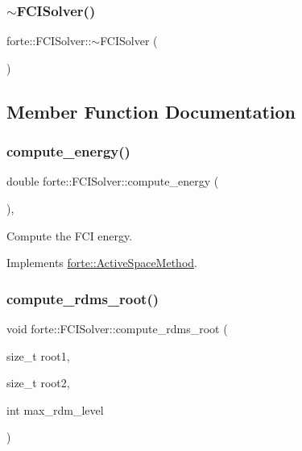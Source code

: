 \subsubsection{\texorpdfstring{$\sim$\+F\+C\+I\+Solver()}{~FCISolver()}}
{\footnotesize\ttfamily forte\+::\+F\+C\+I\+Solver\+::$\sim$\+F\+C\+I\+Solver (\begin{DoxyParamCaption}{ }\end{DoxyParamCaption})\hspace{0.3cm}{\ttfamily [default]}}



\subsection{Member Function Documentation}
\mbox{\label{classforte_1_1_f_c_i_solver_a5ea02e6826ffd8eb01fd25c229517159}} 
\subsubsection{\texorpdfstring{compute\+\_\+energy()}{compute\_energy()}}
{\footnotesize\ttfamily double forte\+::\+F\+C\+I\+Solver\+::compute\+\_\+energy (\begin{DoxyParamCaption}{ }\end{DoxyParamCaption})\hspace{0.3cm}{\ttfamily [override]}, {\ttfamily [virtual]}}



Compute the F\+CI energy. 



Implements \mbox{\hyperlink{classforte_1_1_active_space_method_a99736e2b94405371b224b0750569b077}{forte\+::\+Active\+Space\+Method}}.

\mbox{\label{classforte_1_1_f_c_i_solver_a36c1bb8d06f2b2b28b5700c861e5acae}} 
\subsubsection{\texorpdfstring{compute\+\_\+rdms\+\_\+root()}{compute\_rdms\_root()}}
{\footnotesize\ttfamily void forte\+::\+F\+C\+I\+Solver\+::compute\+\_\+rdms\+\_\+root (\begin{DoxyParamCaption}\item[{size\+\_\+t}]{root1,  }\item[{size\+\_\+t}]{root2,  }\item[{int}]{max\+\_\+rdm\+\_\+level }\end{DoxyParamCaption})}



